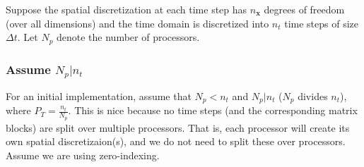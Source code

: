 \documentclass[a4paper,12pt]{article}
\begin{document}
Suppose the spatial discretization at each time step has $n_{\mathbf{x}}$ degrees of freedom (over all dimensions) and the time domain
is discretized into $n_t$ time steps of size $\Delta t$. Let $N_p$ denote the number of processors.


%
%
%

\subsubsection{Assume $N_p | n_t$}

For an initial implementation, assume that $N_p < n_t$ and $N_p | n_t$ ($N_p$ divides $n_t$), where $P_T = \frac{n_t}{N_p}$. This is nice
because no time steps (and the corresponding matrix blocks) are split over multiple processors. That is, each processor will create its own
spatial discretizaion(s), and we do not need to split these over processors. Assume we are using zero-indexing. 
\end{document}
